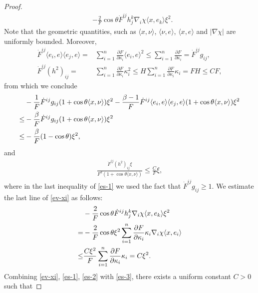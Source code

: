 \documentclass[11pt,reqno]{amsart}
\theoremstyle{definition}
\theoremstyle{remark}
\numberwithin{equation}{section}
\renewcommand{\(}{\left(}
\renewcommand{\)}{\right)}
\renewcommand{\-}{\overline}
\begin{document}
\begin{proof}
\begin{align}
	&-\frac{2}{F}\cos\theta\dot{F}^{ij}h_j^k\nabla_i \chi \langle x,e_k\rangle\xi^2.\label{ev-xi}
\end{align}
Note that the geometric quantities, such as $\langle x,\nu\rangle$, $\langle \nu,e\rangle$, $\langle x,e\rangle$ and $|\nabla\chi|$ are uniformly bounded. Moreover, 
\begin{align*}
	\dot{F}^{ij}\langle e_i,e\rangle\langle e_j,e\rangle=&\sum_{i=1}^n\frac{\partial F}{\partial\kappa_i}\langle e_i,e\rangle^2\leq \sum_{i=1}^n\frac{\partial F}{\partial\kappa_i}=\dot{F}^{ij}g_{ij},\\
	\dot{F}^{ij}(h^2)_{ij}=&\sum_{i=1}^n{\frac{\partial F}{\partial \kappa_i}\kappa_i^2}\leq H\sum_{i=1}^n\frac{\partial F}{\partial\kappa_i}\kappa_i=FH\leq CF,
\end{align*}
from which we conclude
\begin{align}
	&-\frac{1}{F}\dot{F}^{ij}g_{ij}(1+\cos\theta\langle x,\nu \rangle)\xi^2-\frac{\beta-1}{F}\dot{F}^{ij}\langle e_i,e\rangle \langle e_j,e\rangle(1+\cos\theta\langle x,\nu \rangle)\xi^2\notag\\
	\leq&-\frac{\beta}{F}\dot{F}^{ij}g_{ij}(1+\cos\theta\langle x,\nu \rangle)\xi^2\notag\\
	\leq&-\frac{\beta}{F}(1-\cos\theta)\xi^2,\label{es-1}
\end{align}
and
\begin{align}
	\frac{\dot{F}^{ij}(h^2)_{ij}\xi}{F^2(1+\cos\theta\langle x,\nu \rangle)}\leq \frac{C}{F}\xi,\label{es-2}
\end{align}
where in the last inequality of \eqref{es-1} we used the fact that $\dot{F}^{ij}g_{ij}\geq 1$. We estimate the last line of \eqref{ev-xi} as follows:
\begin{align}
	&-\frac{2}{F}\cos\theta\dot{F}^{ij}h_j^k\nabla_i \chi \langle x,e_k\rangle\xi^2\notag\\
	=&-\frac{2}{F}\cos\theta\xi^2\sum_{i=1}^n{\frac{\partial F}{\partial\kappa_i}\kappa_i}\nabla_i\chi \langle x,e_i\rangle\notag\\
	\leq&\frac{C\xi^2}{F}\sum_{i=1}^n{\frac{\partial F}{\partial\kappa_i}\kappa_i}
	=C\xi^2.\label{es-3}
\end{align}
Combining \eqref{ev-xi}, \eqref{es-1}, \eqref{es-2} with \eqref{es-3}, there exists a uniform constant $C>0$ such that 


\end{proof}
\end{document}
